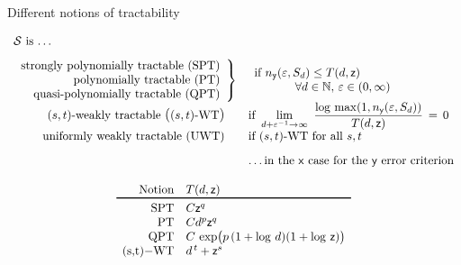 \documentclass[graybox]{svmult}
\newcommand{\naturals}{\mathbb{N}}
\newcommand{\SPT}{\textup{SPT}\xspace}
\newcommand{\PT}{\textup{PT}\xspace}
\newcommand{\QPT}{\textup{QPT}\xspace}
\newcommand{\WT}{\textup{WT}\xspace}
\newcommand{\UWT}{\textup{UWT}\xspace}
\newcommand{\calS}{{\mathcal{S}}}
\newcommand{\fh}[1]{{\color{OliveGreen}{#1}}}
\begin{document}
\begin{table}
{\normalsize
    \caption{Different notions of tractability}
\begin{gather*}
\begin{array}{rll}
\multicolumn{1}{l}{\calS \text{ is \ldots}} \\[2ex]
\left . \begin{array}{rl}
\text{strongly polynomially tractable (\SPT)} \\
\text{polynomially tractable (\PT)} \\
\text{quasi-polynomially tractable (\QPT)}
\end{array} \right\} & 
\begin{array}{l}
\text{if }
n_{\texttt{y}}(\varepsilon,S_d) \le T(d,\mathsf{z}) \\ \hspace{8ex}\forall d \in \naturals, \, \varepsilon \in (0,\infty)
\end{array}\\
(s,t)\text{-weakly tractable {\large(}$(s,t)$-\WT {\large)}} \phantom{\}\}} 
&
\text{if } \displaystyle \lim_{d+\varepsilon^{-1}\to\infty}\   
\frac{\log\,\max(1,n_{\mathsf{y}}(\varepsilon,S_d))}{T(d,\mathsf{z})}\,=\,0 \\
\text{uniformly weakly tractable (\UWT)} \phantom{\}\}} 
&
\text{if $(s,t)$-\WT for all } s, t
\\[2ex]
 & \multicolumn{1}{r}{\text{\ldots in the }\mathsf{x} \text{ case for the } \mathsf{y} \text{ error criterion}}
\end{array} \\[2ex]
\begin{array}{r@{\quad}l}
 \text{Notion} & T(d,\mathsf{z}) \\
 \toprule
      \SPT & C \mathsf{z}^q \\
      \PT& C d^p \mathsf{z}^q \\
      \QPT& C\,\exp\bigl(p\,(1+\log\,d)(1+\log\, \mathsf{z})\bigr) \\
      $(s,t)$-\WT & d^{\,t}+\mathsf{z}^{s}
\end{array}
\end{gather*}
    \label{table:tractDef}
    }
\end{table}

\fh{I rewrote the definitions.  We can get the old ones back if you want.}
\iffalse
\end{document}
